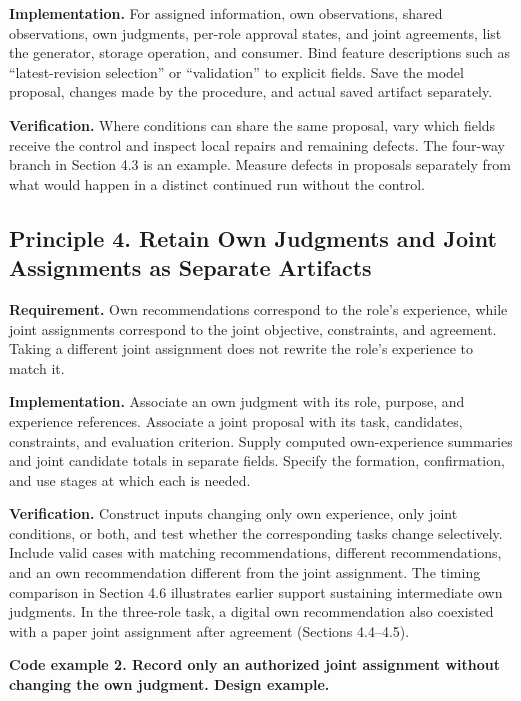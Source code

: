 \documentclass[10pt,a4paper]{article}
\begin{document}
\textbf{Implementation.} For assigned information, own observations, shared observations, own judgments, per-role approval states, and joint agreements, list the generator, storage operation, and consumer. Bind feature descriptions such as ``latest-revision selection'' or ``validation'' to explicit fields. Save the model proposal, changes made by the procedure, and actual saved artifact separately.

\textbf{Verification.} Where conditions can share the same proposal, vary which fields receive the control and inspect local repairs and remaining defects. The four-way branch in Section 4.3 is an example. Measure defects in proposals separately from what would happen in a distinct continued run without the control.

\subsection{Principle 4. Retain Own Judgments and Joint Assignments as Separate Artifacts}\label{two-role-failure-design-principle-4.-retain-own-judgments-and-joint-assignments-as-separate-artifacts}

\textbf{Requirement.} Own recommendations correspond to the role's experience, while joint assignments correspond to the joint objective, constraints, and agreement. Taking a different joint assignment does not rewrite the role's experience to match it.

\textbf{Implementation.} Associate an own judgment with its role, purpose, and experience references. Associate a joint proposal with its task, candidates, constraints, and evaluation criterion. Supply computed own-experience summaries and joint candidate totals in separate fields. Specify the formation, confirmation, and use stages at which each is needed.

\textbf{Verification.} Construct inputs changing only own experience, only joint conditions, or both, and test whether the corresponding tasks change selectively. Include valid cases with matching recommendations, different recommendations, and an own recommendation different from the joint assignment. The timing comparison in Section 4.6 illustrates earlier support sustaining intermediate own judgments. In the three-role task, a digital own recommendation also coexisted with a paper joint assignment after agreement (Sections 4.4--4.5).

\textbf{Code example 2. Record only an authorized joint assignment without changing the own judgment. Design example.}
\end{document}
